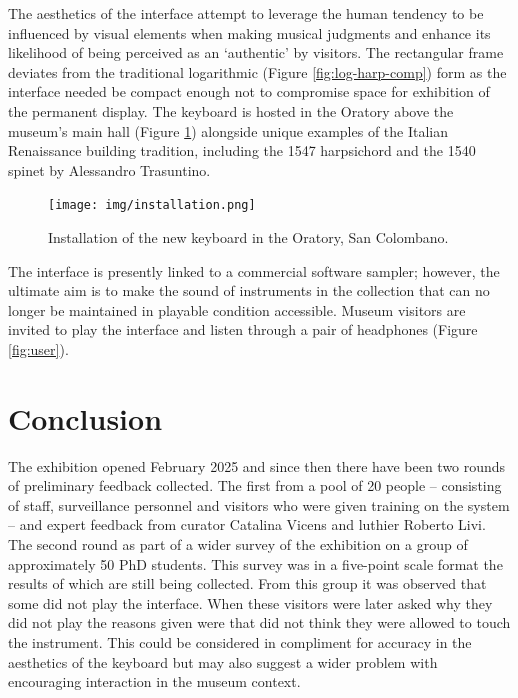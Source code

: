 The aesthetics of the interface attempt to leverage the human tendency to be influenced by visual elements when making musical judgments \cite{tsay_sight_2013, fritz_player_2012,fritz_soloist_2014,fritz_listener_2017} and enhance its likelihood of being perceived as an `authentic' by visitors. The rectangular frame deviates from the traditional logarithmic (Figure \ref{fig:log-harp-comp}) form as the interface needed be compact enough not to compromise space for exhibition of the permanent display. The keyboard is hosted in the Oratory above the museum's main hall (Figure \ref{fig:installed}) alongside unique examples of the Italian Renaissance building tradition, including the 1547 harpsichord and the 1540 spinet by Alessandro Trasuntino.

\begin{figure}
    \centering
    \texttt{[image: img/installation.png]}
    \caption{Installation of the new keyboard in the Oratory, San Colombano.}
    \label{fig:installed}
\end{figure}\vfill

The interface is presently linked to a commercial software sampler; however, the ultimate aim is to make the sound of instruments in the collection that can no longer be maintained in playable condition accessible. Museum visitors are invited to play the interface and listen through a pair of headphones (Figure \ref{fig:user}).


\section{Conclusion}

The exhibition opened February 2025 and since then there have been two rounds of preliminary feedback collected. The first from a pool of 20 people -- consisting of staff, surveillance personnel and visitors who were given training on the system -- and expert feedback from curator Catalina Vicens and luthier Roberto Livi. The second round as part of a wider survey of the exhibition on a group of approximately 50 PhD students. This survey was in a five-point scale format the results of which are still being collected. From this group it was observed that some did not play the interface. When these visitors were later asked why they did not play the reasons given were that did not think they were allowed to touch the instrument. This could be considered in compliment for accuracy in the aesthetics of the keyboard but may also suggest a wider problem with  encouraging interaction in the museum context.

